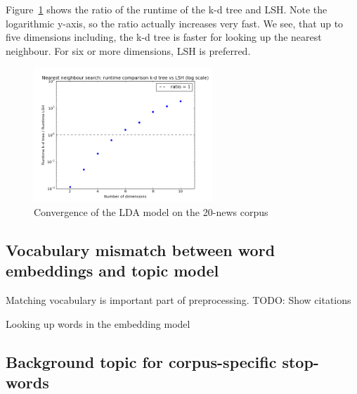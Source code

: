 \documentclass[
        a4paper,
        titlepage,
        twoside,
        parskip
        ]{scrbook}
\theoremstyle{break}
\begin{document}
Figure~\ref{fig:lsh_vs_kdtree} shows the ratio of the runtime of the k-d tree and LSH.
Note the logarithmic y-axis, so the ratio actually increases very fast.
We see, that up to five dimensions including, the k-d tree is faster for looking up the nearest neighbour.
For six or more dimensions, LSH is preferred.
\begin{figure}
       \centering
       \includegraphics[width=0.6\textwidth]{figures/lsh_vs_kdtree.png}
       \caption{Convergence of the LDA model on the 20-news corpus}
       \label{fig:lsh_vs_kdtree}
\end{figure}
\subsection{Vocabulary mismatch between word embeddings and topic model}

Matching vocabulary is important part of preprocessing.
TODO: Show citations

\begin{algorithm}
  \caption{Looking up words in the embedding model}
  \label{euclid}
  \begin{algorithmic}[1]
      \State{}
      \State{}
      \State{}
    \EndIf
    \EndProcedure
  \end{algorithmic}
\end{algorithm}

\subsection{Background topic for corpus-specific stop-words}
\end{document}
